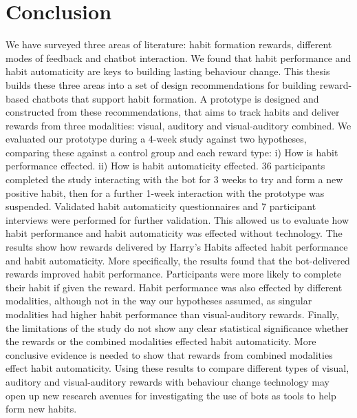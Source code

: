 \section{Conclusion}
We have surveyed three areas of literature: habit formation rewards, different modes of feedback and chatbot interaction. We found that habit performance and habit automaticity are keys to building lasting behaviour change. This thesis builds these three areas into a set of design recommendations for building reward-based chatbots that support habit formation.
A prototype is designed and constructed from these recommendations, that aims to track habits and deliver rewards from three modalities: visual, auditory and visual-auditory combined.
We evaluated our prototype during a 4-week study against two hypotheses, comparing these against a control group and each reward type: i) How is habit performance effected. ii) How is habit automaticity effected. 36 participants completed the study interacting with the bot for 3 weeks to try and form a new positive habit, then for a further 1-week interaction with the prototype was suspended. Validated habit automaticity questionnaires and 7 participant interviews were performed for further validation. This allowed us to evaluate how habit performance and habit automaticity was effected without technology. The results show how rewards delivered by Harry's Habits affected habit performance and habit automaticity.
More specifically,
the results found that the bot-delivered rewards improved habit performance. Participants were more likely to complete their habit if given the reward. Habit performance was also effected by different modalities, although not in the way our hypotheses assumed, as singular modalities had higher habit performance than visual-auditory rewards. Finally, the limitations of the study do not show any clear statistical significance whether the rewards or the combined modalities effected habit automaticity. More conclusive evidence is needed to show that rewards from combined modalities effect habit automaticity. Using these results to compare different types of visual, auditory and visual-auditory rewards with behaviour change technology may open up new research avenues for investigating the use of bots as tools to help form new habits.


